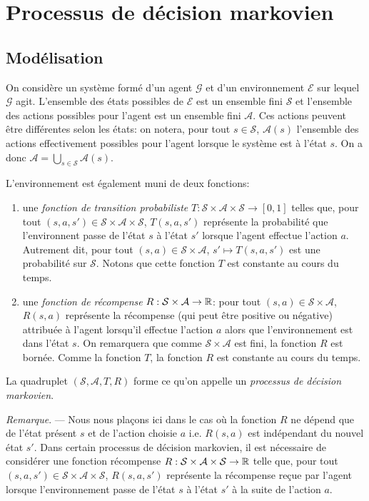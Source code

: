 \chapter{Processus de décision markovien}

\section{Modélisation}

On considère un système formé d'un agent $\mathcal{G}$ et d'un environnement $\mathcal{E}$ sur lequel $\mathcal{G}$ agit. L'ensemble des états possibles de $\mathcal{E}$ est un ensemble fini $\mathcal{S}$ et l'ensemble des actions possibles pour l'agent est un ensemble fini $\mathcal{A}$. Ces actions peuvent être différentes selon les états: on notera, pour tout $s\in\mathcal{S}$, $\mathcal{A}(s)$ l'ensemble des actions effectivement possibles pour l'agent lorsque le système est à l'état $s$. On a donc $\mathcal{A}=\bigcup_{s\in\mathcal{S}}\mathcal{A}(s)$.

L'environnement est également muni de deux fonctions:
\begin{enumerate}
	\item une \textit{fonction de transition probabiliste} $T:\mathcal{S}\times \mathcal{A} \times \mathcal{S} \to [0, 1]$ telles que, pour tout $(s,a,s')\in\mathcal{S}\times\mathcal{A}\times\mathcal{S}$,  $T(s,a,s')$ représente la probabilité que l'environnent passe de l'état $s$ à l'état $s'$ lorsque l'agent effectue l'action $a$. Autrement dit, pour tout $(s,a)\in\mathcal{S}\times\mathcal{A}$, $s'\mapsto T(s,a,s')$ est une probabilité sur $\mathcal{S}$. Notons que cette fonction $T$ est constante au cours du temps.
	\item une \textit{fonction de récompense} $R: \mathcal{S}\times \mathcal{A} \to \mathbb{R}$: pour tout $(s,a)\in\mathcal{S}\times\mathcal{A}$, $R(s,a)$ représente la récompense (qui peut être positive ou négative) attribuée à l'agent lorsqu'il effectue l'action $a$ alors que l'environnement est dans l'état $s$. On remarquera que comme $\mathcal{S}\times \mathcal{A}$ est fini, la fonction $R$ est bornée. Comme la fonction $T$, la fonction $R$ est constante au cours du temps.
\end{enumerate}

La quadruplet $(\mathcal{S}, \mathcal{A}, T, R)$ forme ce qu'on appelle un \textit{processus de décision markovien}.

\medskip

\textit{Remarque}. --- Nous nous plaçons ici dans le cas où la fonction $R$ ne dépend que de l'état présent $s$ et de l'action choisie $a$ i.e. $R(s,a)$ est indépendant du nouvel état $s'$. Dans certain processus de décision markovien, il est nécessaire de considérer une fonction récompense $R:\mathcal{S}\times\mathcal{A}\times\mathcal{S} \to \mathbb{R}$ telle que, pour tout $(s,a,s')\in\mathcal{S}\times\mathcal{A}\times\mathcal{S}$, $R(s,a,s')$ représente la récompense reçue par l'agent lorsque l'environnement passe de l'état $s$ à l'état $s'$ à la suite de l'action $a$.

